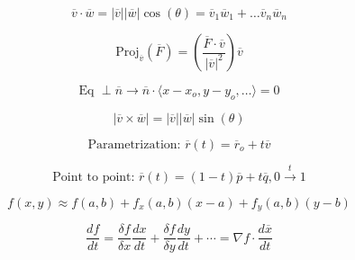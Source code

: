 \documentclass[12pt]{article}
\begin{document}
\begin{multicols}{2}

  \begin{equation*}
    \overline{v}\cdot\overline{w}=|\overline{v}||\overline{w}|\cos(\theta)=\overline{v}_1\overline{w}_1+\dots\overline{v}_n\overline{w}_n
    
  \end{equation*}

  \begin{equation*}
    \text{Proj}_{\overline{v}}(\overline{F})=\left( \dfrac{\overline{F}\cdot\overline{v}}{|\overline{v}|^2} \right)\overline{v}
  \end{equation*}

\end{multicols}

\vspace{-60pt}

\begin{multicols}{2}

  \begin{equation*}
    \text{Eq }\perp\overline{n}\rightarrow \overline{n}\cdot\langle x-x_o, y-y_o,\dots\rangle=0
  \end{equation*}
    
  \begin{equation*}
    |\overline{v}\times\overline{w}|=|\overline{v}||\overline{w}|\sin(\theta)
  \end{equation*}

\end{multicols}

\vspace{-30pt}

\begin{multicols}{2}

  \begin{equation*}
    \text{Parametrization: }\overline{r}(t)=\overline{r}_o+t\overline{v}
  \end{equation*}
    
  \begin{equation*}
    \text{Point to point: }\overline{r}(t)=(1-t)\overline{p}+t\overline{q}, 0\xrightarrow{t}1
  \end{equation*}

\end{multicols}

\vspace{-30pt}

\begin{multicols}{2}

  \begin{equation*}
    f(x,y)\approx f(a,b) + f_x(a,b)(x-a) + f_y(a,b)(y-b)
  \end{equation*}
    
  \begin{equation*}
    \dfrac{df}{dt}=\dfrac{\delta f}{\delta x}\dfrac{dx}{dt} + \dfrac{\delta f}{\delta y}\dfrac{dy}{dt} + \cdots = \nabla f\cdot\frac{d\overline{x}}{dt}
  \end{equation*}

\end{multicols}
\end{document}
